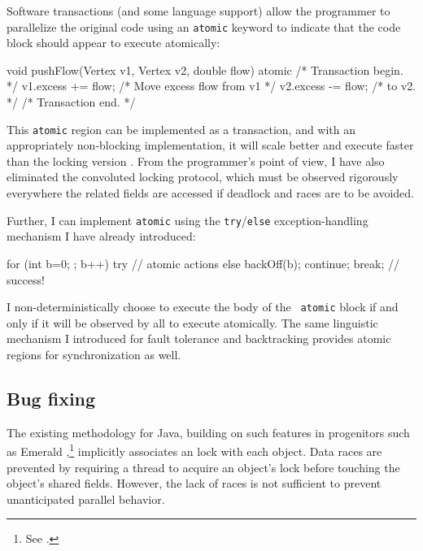 Software transactions (and some language support) allow the
programmer to parallelize the original code using an \texttt{atomic}
keyword to indicate that the code block should appear to execute
atomically: 
\begin{inlinecode}
void pushFlow(Vertex v1, Vertex v2, double flow) {
  atomic { /* Transaction begin. */
    v1.excess += flow; /* Move excess flow from v1 */
    v2.excess -= flow; /* to v2.                   */
  } /* Transaction end. */
}
\end{inlinecode}

This {\tt atomic} region can be implemented as a transaction, and
with an appropriately non-blocking implementation, it
will scale better and execute faster than the locking version
\cite{AnanianAsKuLeLi04,HarrisFr03,GreenwaldCh96,MassalinPu91,HerlihyMo93,ShavitTo95}.
From the programmer's point of view, I have also eliminated the
convoluted locking protocol, which must
be observed rigorously everywhere the related fields are accessed if
deadlock and races are to be avoided.

Further, I can implement {\tt atomic} using the {\tt try}/{\tt else}
exception-handling mechanism I have already introduced:
\begin{inlinecode}
for (int b=0; ; b++) {
  try {
    // atomic actions
  } else {
    backOff(b);
    continue;
  }
  break; // success!
}
\end{inlinecode}

I non-deterministically choose to execute the body of the {\tt
  atomic} block if and only if it will be observed by all to execute
atomically.  The same linguistic mechanism I introduced for
fault tolerance and backtracking provides atomic regions for
synchronization as well.

\subsection{Bug fixing}\label{sec:stringbuffer}
The existing  methodology for Java,
building on such features in progenitors such as Emerald
\cite{BlackHuJuLe86,JulSt91},\footnote{See .}
implicitly associates an 
lock with each object.
Data races are prevented by
requiring a thread to acquire an
object's lock before touching the object's shared fields.
However, the lack of races is not sufficient to prevent unanticipated
parallel behavior.

